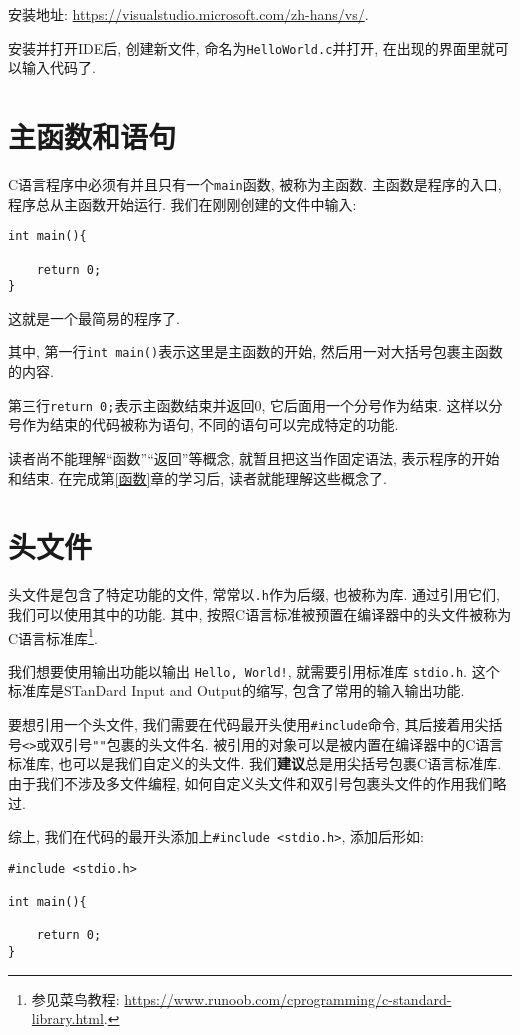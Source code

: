             安装地址: \href{https://visualstudio.microsoft.com/zh-hans/vs/}{https://visualstudio.microsoft.com/zh-hans/vs/}.

        安装并打开IDE后, 创建新文件, 命名为\texttt{HelloWorld.c}并打开, 在出现的界面里就可以输入代码了.

    \section{主函数和语句} \label{主函数和语句}
        C语言程序中必须有并且只有一个\texttt{main}函数, 被称为主函数. 主函数是程序的入口, 程序总从主函数开始运行. 我们在刚刚创建的文件中输入:
\begin{lstlisting}
int main(){

    return 0;
}
\end{lstlisting}
        这就是一个最简易的程序了.

        其中, 第一行\texttt{int main()}表示这里是主函数的开始, 然后用一对大括号包裹主函数的内容.

        第三行\texttt{return 0;}表示主函数结束并返回0, 它后面用一个分号作为结束. 这样以分号作为结束的代码被称为语句, 不同的语句可以完成特定的功能.

        读者尚不能理解``函数''``返回''等概念, 就暂且把这当作固定语法, 表示程序的开始和结束. 在完成第\ref{函数}章的学习后, 读者就能理解这些概念了.

    \section{头文件} \label{头文件}
        头文件是包含了特定功能的文件, 常常以\texttt{.h}作为后缀, 也被称为库. 通过引用它们, 我们可以使用其中的功能. 其中, 按照C语言标准被预置在编译器中的头文件被称为C语言标准库\footnote{参见菜鸟教程: \href{https://www.runoob.com/cprogramming/c-standard-library.html}{https://www.runoob.com/cprogramming/c-standard-library.html}.}.

        我们想要使用输出功能以输出 \texttt{Hello, World!}, 就需要引用标准库 \texttt{stdio.h}. 这个标准库是STanDard Input and Output的缩写, 包含了常用的输入输出功能.

        要想引用一个头文件, 我们需要在代码最开头使用\texttt{\#include}命令, 其后接着用尖括号\texttt{<>}或双引号\texttt{""}包裹的头文件名. 被引用的对象可以是被内置在编译器中的C语言标准库, 也可以是我们自定义的头文件. 我们\textbf{建议}总是用尖括号包裹C语言标准库. 由于我们不涉及多文件编程, 如何自定义头文件和双引号包裹头文件的作用我们略过.

        综上, 我们在代码的最开头添加上\texttt{\#include <stdio.h>}, 添加后形如:
\begin{lstlisting}
#include <stdio.h>

int main(){

    return 0;
}
\end{lstlisting}

